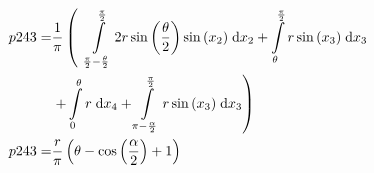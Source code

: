 \begin{align}
    p243 =&\frac{1}{\pi} \left(\;\;\int\limits_{\frac{\pi}{2} - \frac{\theta}{2}}^{\frac{\pi}{2}}2 r \sin{\left (\frac{\theta}{2} \right )} \sin{\left (x_{2} \right )}\;\mathrm{d}x_{2}+\int\limits_{\theta}^{\frac{\pi}{2}}r \sin{\left (x_{3} \right )}\;\mathrm{d}x_{3}\right.\notag\\
 &\left.+\int\limits_{0}^{\theta}r\;\mathrm{d}x_{4}+\int\limits_{\pi - \frac{\alpha}{2}}^{\frac{\pi}{2}}r \sin{\left (x_{3} \right )}\;\mathrm{d}x_{3}\right)\label{p243Def}\\
    p243 =& \frac{r}{\pi} \left(\theta - \cos{\left (\frac{\alpha}{2} \right )} + 1\right)\label{p243Sln}
\end{align}